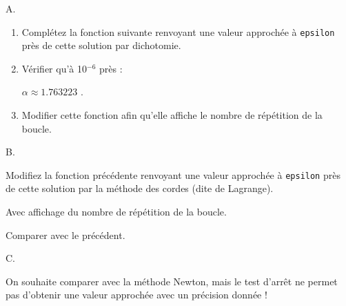 \documentclass[11pt,a4paper]{article}
\renewcommand{\:}{\textbackslash}
\begin{document}
\setlength{\columnseprule}{.2pt}
\begin{multicols}{3}
A.
\begin{enumerate}
\item Complétez la fonction suivante renvoyant une valeur approchée à \texttt{epsilon} près de cette solution par dichotomie.

\medskip

\hspace{-2em}

\medskip\normalfont

\item Vérifier qu'à 10$^{-6}$ près :

$\alpha\approx 1.763223$ .

\item Modifier cette fonction afin qu'elle affiche le nombre de répétition de la boucle.
\end{enumerate}

\vfill\columnbreak

B.

Modifiez la fonction précédente renvoyant une valeur approchée à \texttt{epsilon} près de cette solution par la méthode des cordes (dite de Lagrange).

\medskip

Avec affichage du nombre de répétition de la boucle.

\medskip

Comparer avec le précédent.

\vfill\columnbreak

C.

On souhaite comparer avec la méthode Newton, mais le test d'arrêt ne permet pas d'obtenir une valeur approchée avec un précision donnée !


\end{multicols}
\end{document}
